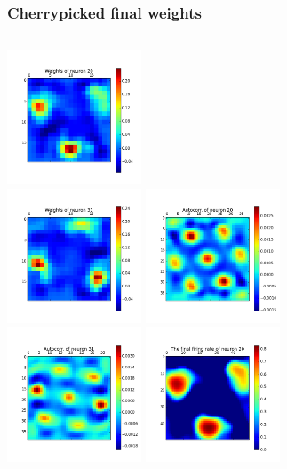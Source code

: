 \begin{frame}
\frametitle{Cherrypicked final weights}
\begin{columns}[t]
\centering
\includegraphics[width=4cm,height=4cm]{neurons/neuron_w_20.png}\\
\includegraphics[width=4cm,height=4cm]{neurons/neuron_w_31.png}
\centering
\includegraphics[width=4cm,height=4cm]{neurons/neuron_a_20.png}\\
\includegraphics[width=4cm,height=4cm]{neurons/neuron_a_31.png}
\centering
\includegraphics[width=4cm,height=4cm]{neurons/neuron_r_20.png}\\

\end{columns}
\end{frame}
